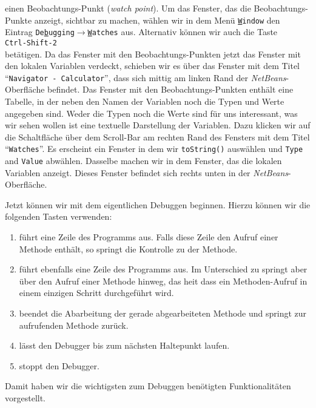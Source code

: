 \documentclass{article}
\begin{document}
einen Beobachtungs-Punkt (\emph{watch point}).
Um das Fenster, das die Beobachtungs-Punkte anzeigt, sichtbar zu machen, w\"ahlen wir in dem
Men\"u \texttt{\underline{W}indow} den Eintrag
\texttt{De\underline{b}ugging}$\rightarrow$\texttt{\underline{W}atches} aus.  Alternativ
k\"onnen wir auch die Taste \\[0.1cm]
\hspace*{1.3cm} \texttt{Ctrl-Shift-2} \\[0.1cm]
bet\"atigen.  Da das Fenster mit den Beobachtungs-Punkten jetzt das Fenster mit den lokalen
Variablen verdeckt, schieben wir es \"uber das Fenster mit dem Titel 
``\texttt{Navigator - Calculator}'', dass sich mittig am linken Rand der
\textsl{NetBeans}-Oberfl\"ache befindet.  Das Fenster mit den Beobachtungs-Punkten enth\"alt
eine Tabelle, in der neben den Namen der Variablen noch die Typen und Werte angegeben
sind.  Weder die Typen noch die Werte sind f\"ur uns interessant, was wir sehen wollen ist
eine textuelle Darstellung der Variablen.  Dazu klicken wir auf die Schaltfl\"ache \"uber dem
Scroll-Bar am rechten Rand des Fensters mit dem Titel ``\texttt{Watches}''.  Es erscheint ein Fenster in dem wir
\texttt{toString()} ausw\"ahlen und \texttt{Type} and \texttt{Value} abw\"ahlen.
Dasselbe machen wir in dem Fenster, das die lokalen
Variablen anzeigt.  Dieses Fenster befindet sich rechts unten in der
\textsl{NetBeans}-Oberfl\"ache.

Jetzt k\"onnen wir mit dem eigentlichen Debuggen beginnen.  Hierzu k\"onnen wir die folgenden
Tasten verwenden:
\begin{enumerate}
\item {} f\"uhrt eine Zeile des Programms aus.
      Falls diese Zeile den Aufruf einer Methode enth\"alt, so springt
      die Kontrolle zu der Methode.
\item {} f\"uhrt ebenfalls eine Zeile des Programms aus.
      Im Unterschied zu  springt 
      aber \"uber den  Aufruf einer Methode hinweg, das hei\3t dass ein Methoden-Aufruf in
      einem einzigen Schritt durchgef\"uhrt wird.
\item {} beendet die Abarbeitung der gerade abgearbeiteten
      Methode und springt zur aufrufenden Methode zur\"uck.
\item {}  l\"asst den Debugger bis zum n\"achsten Haltepunkt laufen.
\item {} stoppt den Debugger.
\end{enumerate}
Damit haben wir die wichtigsten zum Debuggen ben\"otigten Funktionalit\"aten vorgestellt.
\end{document}
